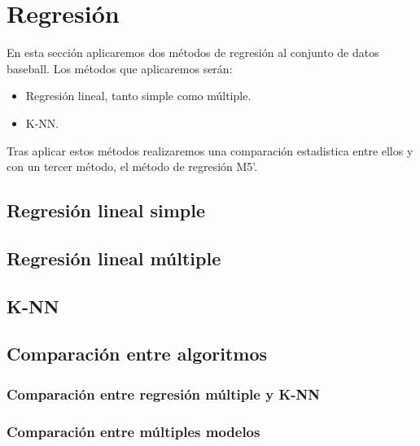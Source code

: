 \section{Regresión}

En esta sección aplicaremos dos métodos de regresión al conjunto de datos baseball. Los métodos que aplicaremos serán:

\begin{itemize}
	\item Regresión lineal, tanto simple como múltiple.
	\item K-NN.
\end{itemize}

Tras aplicar estos métodos realizaremos una comparación estadistica entre ellos y con un tercer método, el método de regresión M5'.

\subsection{Regresión lineal simple}

\subsection{Regresión lineal múltiple}

\subsection{K-NN}

\subsection{Comparación entre algoritmos}

\subsubsection{Comparación entre regresión múltiple y K-NN}

\subsubsection{Comparación entre múltiples modelos}
